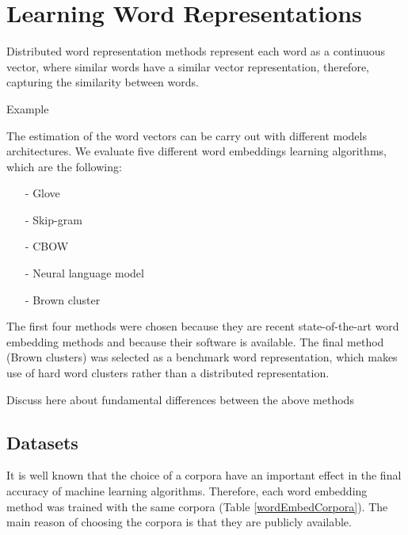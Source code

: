 
\section{Learning Word Representations}


Distributed word representation methods represent each word as a continuous vector, where similar words have a similar vector representation, therefore, capturing
the similarity between words.

{\color{red}Example}

The estimation of the word vectors can be carry out with different models architectures. We evaluate five different word embeddings learning algorithms, which are the following: 
 
\begin{itemize}
\item[-] Glove \cite{pennington2014glove}
\item[-] Skip-gram \cite{Mikolov13}
\item[-] CBOW \cite{Mikolov13}
\item[-] Neural language model \cite{turian2010word}
\item[-] Brown cluster \cite{Brown92class-basedn-gram}
\end{itemize}

The first four methods were chosen because they are recent
state-of-the-art word embedding methods and because their software is
available. The final method (Brown clusters) was selected as a benchmark word representation, which makes use of hard word clusters rather than a distributed representation.

{\color{red}Discuss here about fundamental differences between the above methods}

\subsection{Datasets}
It is well known that the choice of a corpora have an important effect in the final accuracy of machine learning algorithms. 
Therefore, each word embedding method was trained with the same corpora (Table \ref{wordEmbedCorpora}). The main reason of choosing the corpora 
is that they are publicly available. 

